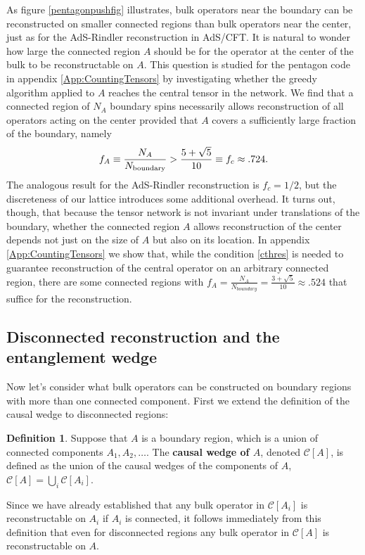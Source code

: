 \documentclass[12pt]{article}
\theoremstyle{plain}
\theoremstyle{plain}
\theoremstyle{plain}
\theoremstyle{plain}
\theoremstyle{result}
\theoremstyle{remark}
\theoremstyle{conjecture}
\theoremstyle{observation}
\theoremstyle{definition}
\theoremstyle{corollary}
\theoremstyle{definition}
\theoremstyle{definition}
\newtheorem{definition}{Definition}
\theoremstyle{assumption}
\theoremstyle{definition}
\theoremstyle{problem}
\theoremstyle{fact}
\newcommand{\be}{\begin{equation}}
\newcommand{\ee}{\end{equation}}
\newcommand{\CA}{\mathcal{C}[A]}
\begin{document}
As figure \ref{pentagonpushfig} illustrates, bulk operators near the boundary can be reconstructed on smaller connected regions than bulk operators near the center, just as for the AdS-Rindler reconstruction in AdS/CFT. 
It is natural to wonder how large the connected region $A$ should be for the operator at the center of the bulk to be reconstructable on $A$. 
This question is studied for the pentagon code in appendix \ref{App:CountingTensors} by investigating whether the greedy algorithm applied to $A$ reaches the central tensor in the network. We find that a connected region of $N_A$ boundary spins necessarily allows reconstruction of all operators acting on the center provided that $A$ covers a sufficiently large fraction of the boundary, namely
\be\label{cthres}
f_A \equiv \frac{N_A}{N_{\rm boundary}}>\frac{5+\sqrt{5}}{10}\equiv f_c\approx .724.
\ee
The analogous result for the AdS-Rindler reconstruction is $f_c=1/2$, but the discreteness of our lattice introduces some additional overhead.
It turns out, though, that because the tensor network is not invariant under translations of the boundary, whether the connected region $A$ allows reconstruction of the center depends not just on the size of $A$ but also on its location. In appendix \ref{App:CountingTensors} we show that, while the condition \eqref{cthres} is needed to guarantee reconstruction of the central operator on an arbitrary connected region, there are some connected regions with $f_A =\frac{N_A}{N_{boundary}}=\frac{3+\sqrt{5}}{10}\approx .524$ that suffice for the reconstruction.


\subsection{Disconnected reconstruction and the entanglement wedge}
Now let's consider what bulk operators can be constructed on boundary regions with more than one connected component. First we extend the definition of the causal wedge to disconnected regions:
\begin{definition}
Suppose that $A$ is a boundary region, which is a union of connected components $A_1,A_2,\ldots$.  The \textbf{causal wedge of $A$}, denoted $\CA$, is defined as the union of the causal wedges of the components of $A$, $\CA=\bigcup_i \mathcal{C}[A_i]$.
\end{definition}
\noindent Since we have already established that any bulk operator in $\mathcal{C}[A_i]$ is reconstructable on $A_i$ if $A_i$ is connected, it follows immediately from this definition that even for disconnected regions any bulk operator in $\CA$ is reconstructable on $A$.
\end{document}
